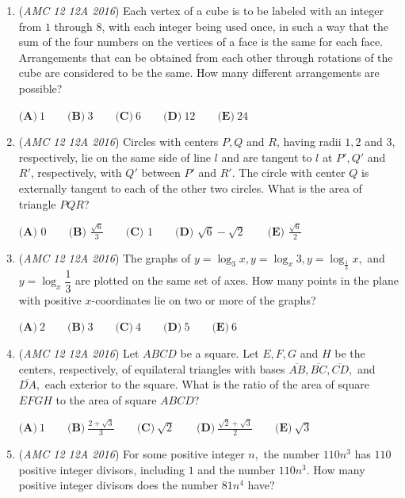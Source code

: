 \begin{enumerate}
 $\textbf{(A)}\ 12\qquad\textbf{(B)}\ 14\qquad\textbf{(C)}\ 16\qquad\textbf{(D)}\ 18\qquad\textbf{(E)}\ 20$


	\item (\textit{AMC 12 12A 2016}) Each vertex of a cube is to be labeled with an integer from $1$ through $8$, with each integer being used once, in such a way that the sum of the four numbers on the vertices of a face is the same for each face.  Arrangements that can be obtained from each other through rotations of the cube are considered to be the same.  How many different arrangements are possible?


 $\textbf{(A)}\ 1\qquad\textbf{(B)}\ 3\qquad\textbf{(C)}\ 6\qquad\textbf{(D)}\ 12\qquad\textbf{(E)}\ 24$


	\item (\textit{AMC 12 12A 2016}) Circles with centers $P, Q$ and $R$, having radii $1, 2$ and $3$, respectively, lie on the same side of line $l$ and are tangent to $l$ at $P', Q'$ and $R'$, respectively, with $Q'$ between $P'$ and $R'$. The circle with center $Q$ is externally tangent to each of the other two circles. What is the area of triangle $PQR$?


 $\textbf{(A) } 0\qquad \textbf{(B) } \frac{\sqrt{6}}{3}\qquad\textbf{(C) } 1\qquad\textbf{(D) } \sqrt{6}-\sqrt{2}\qquad\textbf{(E) }\frac{\sqrt{6}}{2}$


	\item (\textit{AMC 12 12A 2016}) The graphs of $y=\log_3 x, y=\log_x 3, y=\log_\frac{1}{3} x,$ and $y=\log_x \dfrac{1}{3}$ are plotted on the same set of axes. How many points in the plane with positive $x$-coordinates lie on two or more of the graphs? 


 $\textbf{(A)}\ 2\qquad\textbf{(B)}\ 3\qquad\textbf{(C)}\ 4\qquad\textbf{(D)}\ 5\qquad\textbf{(E)}\ 6$


	\item (\textit{AMC 12 12A 2016}) Let $ABCD$ be a square. Let $E, F, G$ and $H$ be the centers, respectively, of equilateral triangles with bases $\overline{AB}, \overline{BC}, \overline{CD},$ and $\overline{DA},$ each exterior to the square. What is the ratio of the area of square $EFGH$ to the area of square $ABCD$? 


 $\textbf{(A)}\ 1\qquad\textbf{(B)}\ \frac{2+\sqrt{3}}{3} \qquad\textbf{(C)}\ \sqrt{2} \qquad\textbf{(D)}\ \frac{\sqrt{2}+\sqrt{3}}{2} \qquad\textbf{(E)}\ \sqrt{3}$


	\item (\textit{AMC 12 12A 2016}) For some positive integer $n,$ the number $110n^3$ has $110$ positive integer divisors, including $1$ and the number $110n^3.$ How many positive integer divisors does the number $81n^4$ have? 



\end{enumerate}

